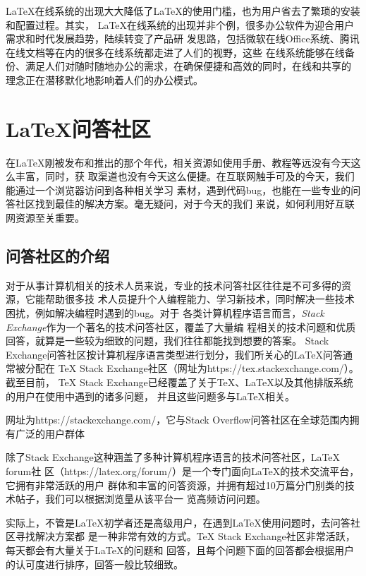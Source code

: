 LaTeX在线系统的出现大大降低了LaTeX的使用门槛，也为用户省去了繁琐的安装和配置过程。其实，
LaTeX在线系统的出现并非个例，很多办公软件为迎合用户需求和时代发展趋势，陆续转变了产品研
发思路，包括微软在线Office系统、腾讯在线文档等在内的很多在线系统都走进了人们的视野，这些
在线系统能够在线备份、满足人们对随时随地办公的需求，在确保便捷和高效的同时，在线和共享的
理念正在潜移默化地影响着人们的办公模式。

\section{\LaTeX 问答社区}
在LaTeX刚被发布和推出的那个年代，相关资源如使用手册、教程等远没有今天这么丰富，同时，获
取渠道也没有今天这么便捷。在互联网触手可及的今天，我们能通过一个浏览器访问到各种相关学习
素材，遇到代码bug，也能在一些专业的问答社区找到最佳的解决方案。毫无疑问，对于今天的我们
来说，如何利用好互联网资源至关重要。

\subsection{问答社区的介绍}
对于从事计算机相关的技术人员来说，专业的技术问答社区往往是不可多得的资源，它能帮助很多技
术人员提升个人编程能力、学习新技术，同时解决一些技术困扰，例如解决编程时遇到的bug。对于
各类计算机程序语言而言，\emph{Stack Exchange}作为一个著名的技术问答社区，覆盖了大量编
程相关的技术问题和优质回答，就算是一些较为细致的问题，我们往往都能找到想要的答案。
Stack Exchange问答社区按计算机程序语言类型进行划分，我们所关心的LaTeX问答通常被分配在
TeX Stack Exchange社区（网址为https://tex.stackexchange.com/）。截至目前，
TeX Stack Exchange已经覆盖了关于TeX、LaTeX以及其他排版系统的用户在使用中遇到的诸多问题，
并且这些问题多与LaTeX相关。

\begin{tcolorbox}[colback=red!5!white, colframe=red!50!black, title=Stack Exchange]
    网址为https://stackexchange.com/，它与Stack Overflow问答社区在全球范围内拥有广泛的用户群体
\end{tcolorbox}

除了Stack Exchange这种涵盖了多种计算机程序语言的技术问答社区，LaTeX forum社
区（https://latex.org/forum/）是一个专门面向LaTeX的技术交流平台，它拥有非常活跃的用户
群体和丰富的问答资源，并拥有超过10万篇分门别类的技术帖子，我们可以根据浏览量从该平台一
览高频访问问题。

实际上，不管是LaTeX初学者还是高级用户，在遇到LaTeX使用问题时，去问答社区寻找解决方案都
是一种非常有效的方式。TeX Stack Exchange社区非常活跃，每天都会有大量关于LaTeX的问题和
回答，且每个问题下面的回答都会根据用户的认可度进行排序，回答一般比较细致。

